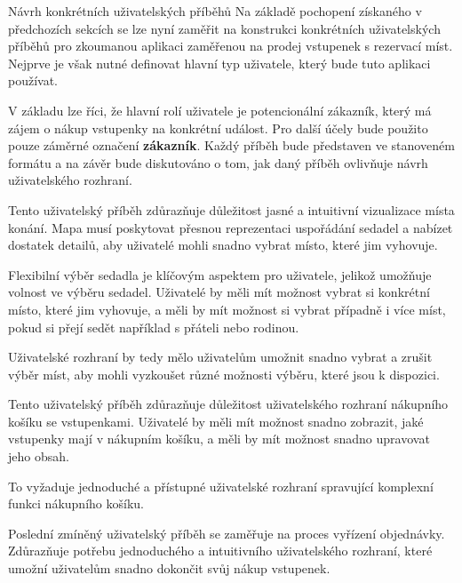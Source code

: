 \begin{subsection}{Návrh konkrétních uživatelských příběhů}
    \label{subsec:navrh-ui-uzivatelske-pribehy-konkretni}
    Na základě pochopení získaného v předchozích sekcích se lze nyní zaměřit na konstrukci konkrétních uživatelských příběhů pro zkoumanou aplikaci zaměřenou na prodej vstupenek s rezervací míst.
    Nejprve je však nutné definovat hlavní typ uživatele, který bude tuto aplikaci používat.

    V základu lze říci, že hlavní rolí uživatele je potencionální zákazník, který má zájem o nákup vstupenky na konkrétní událost.
    Pro další účely bude použito pouze záměrné označení \textbf{zákazník}.
    Každý příběh bude představen ve stanoveném formátu a na závěr bude diskutováno o tom, jak daný příběh ovlivňuje návrh uživatelského rozhraní.

    \userstoryvenuemap

    Tento uživatelský příběh zdůrazňuje důležitost jasné a intuitivní vizualizace místa konání.
    Mapa musí poskytovat přesnou reprezentaci uspořádání sedadel a nabízet dostatek detailů, aby uživatelé mohli snadno vybrat místo, které jim vyhovuje.

    \userstoryseatselection

    Flexibilní výběr sedadla je klíčovým aspektem pro uživatele, jelikož umožňuje volnost ve výběru sedadel.
    Uživatelé by měli mít možnost vybrat si konkrétní místo, které jim vyhovuje, a měli by mít možnost si vybrat případně i více míst, pokud si přejí sedět například s přáteli nebo rodinou.

    Uživatelské rozhraní by tedy mělo uživatelům umožnit snadno vybrat a zrušit výběr míst, aby mohli vyzkoušet různé možnosti výběru, které jsou k dispozici.

    \userstoryshoppingcart

    Tento uživatelský příběh zdůrazňuje důležitost uživatelského rozhraní nákupního košíku se vstupenkami.
    Uživatelé by měli mít možnost snadno zobrazit, jaké vstupenky mají v nákupním košíku, a měli by mít možnost snadno upravovat jeho obsah.

    To vyžaduje jednoduché a přístupné uživatelské rozhraní spravující komplexní funkci nákupního košíku.

    \userstorycheckout

    Poslední zmíněný uživatelský příběh se zaměřuje na proces vyřízení objednávky.
    Zdůrazňuje potřebu jednoduchého a intuitivního uživatelského rozhraní, které umožní uživatelům snadno dokončit svůj nákup vstupenek.


\end{subsection}
